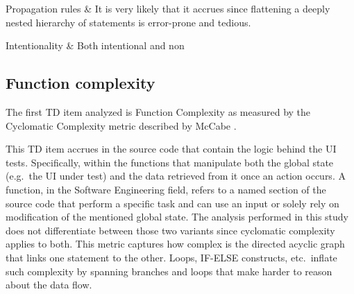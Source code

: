 \begin{table}[!htbp]
\begin{tabu}
			
			
			Propagation rules & It is very likely that it accrues since flattening a deeply nested hierarchy of statements is error-prone and tedious.\\
			\hline
			
			Intentionality & Both intentional and non \\
			\hline 	 	
			
		\end{tabu}
		\label{tab:res-dry-violations}
		\caption[DRY violations specification]{DRY violations specification according to guidelines specified by \cite{mapping_study_td}.}
	\end{table}

	\subsection{Function complexity}
	
	
	The first TD item analyzed is Function Complexity as measured by the Cyclomatic Complexity metric described by McCabe \cite{cyclomatic_complexity}.

    This TD item accrues in the source code that contain the logic behind the UI tests. Specifically, within the functions that manipulate both the global state (e.g.\ the UI under test) and the data retrieved from it once an action occurs. A function, in the Software Engineering field, refers to a named section of the source code that perform a specific task and can use an input or solely rely on modification of the mentioned global state. The analysis performed in this study does not differentiate between those two variants since cyclomatic complexity applies to both. This metric captures how complex is the directed acyclic graph that links one statement to the other. Loops, IF-ELSE constructs, etc.\ inflate such complexity by spanning branches and loops that make harder to reason about the data flow.
    
